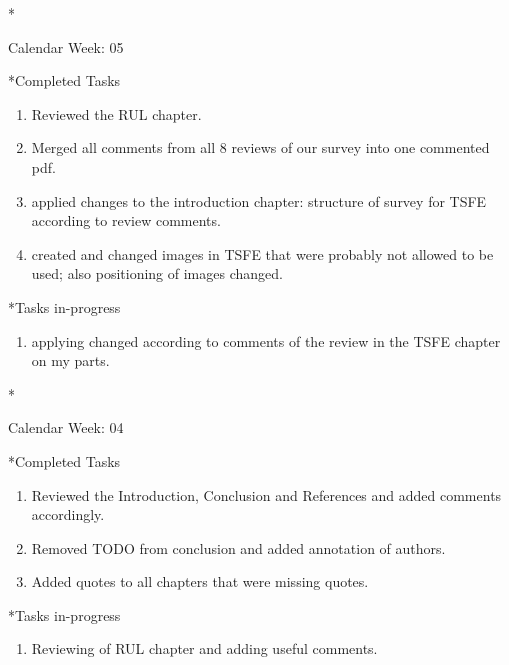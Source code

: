 \documentclass[11pt,a4paper]{article}
\begin{document}
\newpage
\begin{section}*{Calendar Week: 05 \hfill \date{05 February, 2021}}
	
	\begin{subsection}*{Completed Tasks}
		\begin{enumerate}
			\item Reviewed the RUL chapter.
			\item Merged all comments from all 8 reviews of our survey into one commented pdf.
			\item applied changes to the introduction chapter: structure of survey for TSFE according to review comments.
			\item created and changed images in TSFE that were probably not allowed to be used; also positioning of images changed.
		\end{enumerate}
	\end{subsection}
	
	\begin{subsection}*{Tasks in-progress}
		\begin{enumerate}
			\item applying changed according to comments of the review in the TSFE chapter on my parts.
		\end{enumerate}
	\end{subsection}
	
\end{section}

\newpage
\begin{section}*{Calendar Week: 04 \hfill \date{29 January, 2021}}
	
	\begin{subsection}*{Completed Tasks}
		\begin{enumerate}
			\item Reviewed the Introduction, Conclusion and References and added comments accordingly. 
			\item Removed TODO from conclusion and added annotation of authors.
			\item Added quotes to all chapters that were missing quotes.
		\end{enumerate}
	\end{subsection}
	
	\begin{subsection}*{Tasks in-progress}
		\begin{enumerate}
			\item Reviewing of RUL chapter and adding useful comments.
		\end{enumerate}
	\end{subsection}
	
\end{section}
\end{document}
